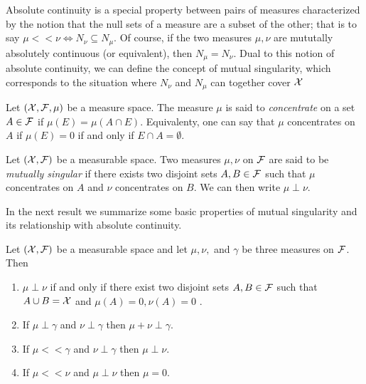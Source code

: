 Absolute continuity is a special property between pairs of measures
characterized by the notion that the null sets of a measure are a
subset of the other; that is to say $\mu<<\nu\Longleftrightarrow N_{\nu}\subseteq N_{\mu}$.
Of course, if the two measures $\mu,\nu$ are mututally absolutely
continuous (or equivalent), then $N_{\mu}=N_{\nu}.$ Dual to this
notion of absolute continuity, we can define the concept of mutual
singularity, which corresponds to the situation where $N_{\nu}$ and
$N_{\mu}$ can together cover $\mathcal{X}$
\begin{defn}
\label{def:concentrationOfMeasure}Let $\left(\mathcal{X},\mathcal{F},\mu\right)$ be a measure
space. The measure $\mu$ is said to \emph{concentrate }on a set $A\in\mathcal{F}$
if $\mu\left(E\right)=\mu\left(A\cap E\right).$ Equivalenty, one
can say that $\mu$ concentrates on $A$ if $\mu\left(E\right)=0$
if and only if $E\cap A=\emptyset.$
\end{defn}

\begin{defn}
\label{def:mutualSingularity}Let $\left(\mathcal{X},\mathcal{F}\right)$ be a measurable
space. Two measures $\mu,\nu$ on $\mathcal{F}$ are said to be \emph{mutually
singular }if there exists two disjoint sets $A,B\in\mathcal{F}$ such that
$\mu$ concentrates on $A$ and $\nu$ concentrates on $B$. We can
then write $\mu\perp\nu$.
\end{defn}

In the next result we summarize some basic properties of mutual singularity
and its relationship with absolute continuity.
\begin{prop}
\label{prop:propertiesSingularityAbsContinuity}Let $\left(\mathcal{X},\mathcal{F}\right)$
be a measurable space and let $\mu,\nu,$ and $\gamma$ be three measures
on $\mathcal{F}$. Then

\begin{enumerate}[label=(\roman*),leftmargin=.1\linewidth,rightmargin=.4\linewidth]
	\item $\mu \perp \nu$ if and only if there exist two disjoint sets $A,B \in \mathcal{F}$ such that $A \cup B= \mathcal{X}$ and $\mu(A) = 0 , \nu(A) = 0 $ .
	\item  If $\mu \perp \gamma $ and $\nu \perp \gamma $ then $\mu + \nu \perp \gamma$.
	\item If $\mu << \gamma $ and $\nu \perp \gamma$ then $\mu \perp \nu$.
	\item If $\mu << \nu $ and $\mu \perp \nu$ then $\mu = 0$.
\end{enumerate}
\end{prop}

